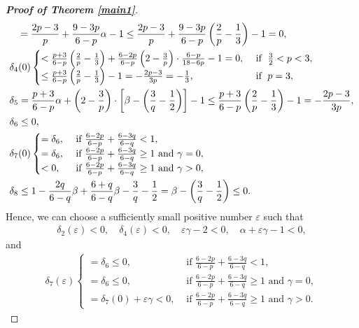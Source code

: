 \documentclass[11pt,reqno]{amsart}
\numberwithin{Thm}{section}
\begin{document}
\begin{proof}[{\bf Proof of Theorem \ref{main1}}]
\begin{align}
&\;\;\;=\frac{2p-3}{p}+\frac{9-3p}{6-p}\alpha-1\leq\frac{2p-3}{p}+\frac{9-3p}{6-p}\left(\frac{2}{p}-\frac{1}{3}\right)-1=0,\notag\\
&\delta_4(0)\begin{cases}
<\frac{p+3}{6-p}\left(\frac{2}{p}-\frac{1}{3}\right)+\frac{6-2p}{6-p}\left(2-\frac{3}{p}\right)\cdot\frac{6-p}{18-6p}-1=0, & \text{ if }\;\frac{3}{2}<p<3, \\
\leq\frac{p+3}{6-p}\left(\frac{2}{p}-\frac{1}{3}\right)-1=-\frac{2p-3}{3p}=-\frac{1}{3}, & \text{ if }\;p=3,
\end{cases}\label{ine3.42}\\
&\delta_5=\frac{p+3}{6-p}\alpha+\left(2-\frac{3}{p}\right)\cdot\left[\beta-\left(\frac{3}{q}-\frac{1}{2}\right)\right]-1\leq\frac{p+3}{6-p}\left(\frac{2}{p}-\frac{1}{3}\right)-1=-\frac{2p-3}{3p},\notag\\
&\delta_6\leq0,\notag\\
&\delta_7(0)\begin{cases}
		=\delta_6, & \text{ if  }\frac{6-2p}{6-p} + \frac{6-3q}{6-q} < 1, \\
		=\delta_6, & \text{ if  }\frac{6-2p}{6-p} + \frac{6-3q}{6-q} \geq 1 \text{ and  }\gamma=0,\\
           <0, & \text{ if  }\frac{6-2p}{6-p} + \frac{6-3q}{6-q} \geq 1 \text{ and  }\gamma>0,
	\end{cases}\notag\\
&\delta_8\leq1-\frac{2q}{6-q}\beta+\frac{6+q}{6-q}\beta-\frac{3}{q}-\frac{1}{2}=\beta-\left(\frac{3}{q}-\frac{1}{2}\right)\leq0.\notag
\end{align}
Hence, we can choose a sufficiently small positive number $\varepsilon$ such that
\begin{align}\label{ine3.43}
\delta_2(\varepsilon)<0,\quad \delta_4(\varepsilon)<0,\quad \varepsilon\gamma-2<0,\quad \alpha+\varepsilon\gamma-1<0,
\end{align}
and
\begin{align}\label{ine3.43a}
\delta_7(\varepsilon)\begin{cases}
		=\delta_6\leq0, & \text{ if  }\frac{6-2p}{6-p} + \frac{6-3q}{6-q} < 1, \\
		=\delta_6\leq0, & \text{ if  }\frac{6-2p}{6-p} + \frac{6-3q}{6-q} \geq 1 \text{ and  }\gamma=0,\\
         =\delta_7(0)+\varepsilon\gamma <0, & \text{ if  }\frac{6-2p}{6-p} + \frac{6-3q}{6-q} \geq 1 \text{ and  }\gamma>0.
	\end{cases}
\end{align}

\end{proof}
\end{document}

